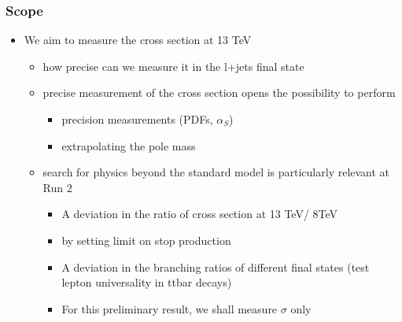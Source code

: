 \documentclass{beamer}
\begin{document}
\begin{frame}
\frametitle{Scope}
\begin{itemize}
\item We aim to measure the cross section at 13 TeV
\begin{itemize}
\item how precise can we measure it in the l+jets final state
\item precise measurement of the cross section opens the possibility to perform
\begin{itemize}
\item precision measurements (PDFs, $\alpha_S$)
\item extrapolating the pole mass \href {http://arxiv.org/abs/1511.00841}{}
\end{itemize}
\end{itemize}
\begin{itemize}
\item search for physics beyond the standard model is particularly relevant at Run 2
\begin{itemize}
\item A deviation in the ratio of cross section at 13 TeV/ 8TeV \href {http://arxiv.org/abs/1206.3557}{}
\item by setting limit on stop production \href {http://arxiv.org/abs/1407.1043}{}
\item A deviation in the branching ratios of different final states (test lepton universality in ttbar decays) %
\item For this preliminary result, we shall measure $\sigma$ only
\end{itemize}
\end{itemize}
\end{itemize}
\end{frame}
\end{document}
